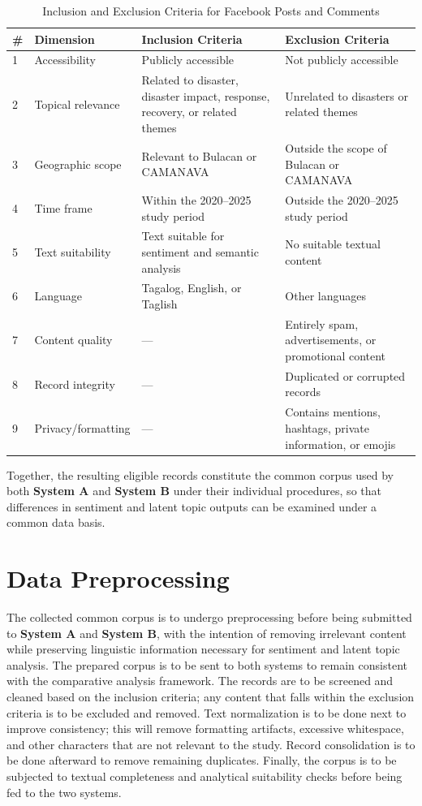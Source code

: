\documentclass[12pt,a4paper]{report}
\newcommand{\sysA}{\textbf{System A}}
\newcommand{\sysB}{\textbf{System B}}
\begin{document}
\begin{table}[htbp]
	\centering
	\caption{Inclusion and Exclusion Criteria for Facebook Posts and Comments}
	\label{tab:screening_criteria}
	\begin{tabular}{p{0.5cm} p{3.2cm} p{5.2cm} p{5.2cm}}
		\toprule
		\textbf{\#} & \textbf{Dimension} & \textbf{Inclusion Criteria} & \textbf{Exclusion Criteria} \\
		\midrule
		1 & Accessibility      & Publicly accessible & Not publicly accessible \\
		2 & Topical relevance  & Related to disaster, disaster impact, response, recovery, or related themes & Unrelated to disasters or related themes \\
		3 & Geographic scope   & Relevant to Bulacan or CAMANAVA & Outside the scope of Bulacan or CAMANAVA \\
		4 & Time frame         & Within the 2020--2025 study period & Outside the 2020--2025 study period \\
		5 & Text suitability   & Text suitable for sentiment and semantic analysis & No suitable textual content \\
		6 & Language           & Tagalog, English, or Taglish & Other languages \\
		7 & Content quality    & --- & Entirely spam, advertisements, or promotional content \\
		8 & Record integrity   & --- & Duplicated or corrupted records \\
		9 & Privacy/formatting & --- & Contains mentions, hashtags, private information, or emojis \\
		\bottomrule
	\end{tabular}
\end{table}

Together, the resulting eligible records constitute the common corpus used by
both \sysA{} and \sysB{} under their individual procedures, so that differences
in sentiment and latent topic outputs can be examined under a common data basis.

\section{Data Preprocessing}

The collected common corpus is to undergo preprocessing before being submitted
to \sysA{} and \sysB, with the intention of removing irrelevant content while
preserving linguistic information necessary for sentiment and latent topic
analysis. The prepared corpus is to be sent to both systems to remain
consistent with the comparative analysis framework. The records are to be
screened and cleaned based on the inclusion criteria; any content that falls
within the exclusion criteria is to be excluded and removed. Text normalization
is to be done next to improve consistency; this will remove formatting
artifacts, excessive whitespace, and other characters that are not relevant to
the study. Record consolidation is to be done afterward to remove remaining
duplicates. Finally, the corpus is to be subjected to textual completeness and
analytical suitability checks before being fed to the two systems.
\end{document}

